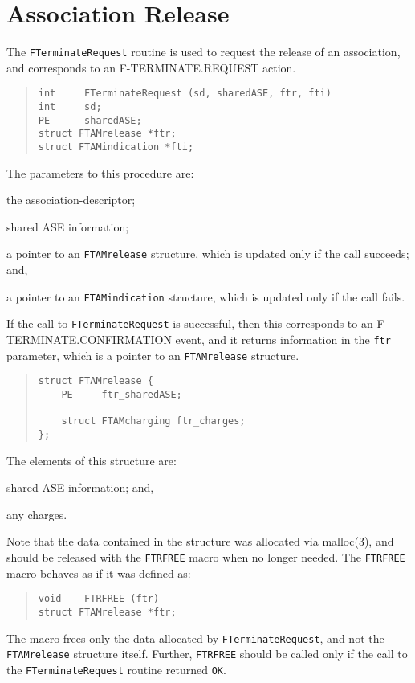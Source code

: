 \section	{Association Release}
The \verb"FTerminateRequest" routine is used to request the release of an
association,
and corresponds to an {\sf F-TERMINATE.REQUEST\/} action.
\begin{quote}\small\begin{verbatim}
int     FTerminateRequest (sd, sharedASE, ftr, fti)
int     sd;
PE      sharedASE;
struct FTAMrelease *ftr;
struct FTAMindication *fti;
\end{verbatim}\end{quote}
\newpage	%
The parameters to this procedure are:
\begin{describe}
\item[\verb"sd":] the association-descriptor;

\item[\verb"sharedASE":] shared ASE information;

\item[\verb"ftr":] a pointer to an \verb"FTAMrelease" structure, which is
updated only if the call succeeds;
and,

\item[\verb"fti":] a pointer to an \verb"FTAMindication" structure, which is
updated only if the call fails.
\end{describe}
If the call to \verb"FTerminateRequest" is successful,
then this corresponds to an {\sf F-TERMINATE.CONFIRMATION\/} event,
and it returns information in the \verb"ftr" parameter,
which is a pointer to an \verb"FTAMrelease" structure.
\begin{quote}\small\begin{verbatim}
struct FTAMrelease {
    PE     ftr_sharedASE;

    struct FTAMcharging ftr_charges;
};
\end{verbatim}\end{quote}
The elements of this structure are:
\begin{describe}
\item[\verb"ftr\_sharedASE":] shared ASE information;
and,

\item[\verb"ftr\_charges":] any charges.
\end{describe}
Note that the data contained in the structure was allocated via \man malloc(3),
and should be released with the \verb"FTRFREE" macro when no longer needed.
The \verb"FTRFREE" macro
behaves as if it was defined as:
\begin{quote}\small\begin{verbatim}
void    FTRFREE (ftr)
struct FTAMrelease *ftr;
\end{verbatim}\end{quote}
The macro frees only the data allocated by \verb"FTerminateRequest",
and not the \verb"FTAMrelease" structure itself.
Further,
\verb"FTRFREE" should be called only if the call to the
\verb"FTerminateRequest" routine returned \verb"OK".

